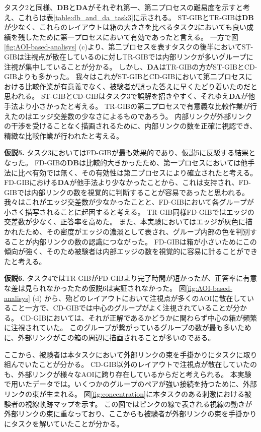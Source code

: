 \documentclass{kuee}
\begin{document}
タスク2と同様、{\bf DB}と{\bf DA}がそれぞれ第一、第二プロセスの難易度を示すと考え、これらは表\ref{table:db_and_da_task3}に示される。
ST-GIBとTR-GIBは{\bf DB}が少なく、これらのレイアウトは箱の大きさを比べるタスク2においても良い成績を残したために第一プロセスにおいて有効であったと言える。
一方で図\ref{fig:AOI-based-analisys} (c)より、第二プロセスを表すタスクの後半においてST-GIBは注視点が散在しているのに対しTR-GIBでは内部リンクが多いグループに注視が集中していることが分かる。
しかし、{\bf DA}はTR-GIBの方がST-GIBとCD-GIBよりも多かった。
我々はこれがST-GIBとCD-GIBにおいて第二プロセスにおける比較作業が有意義でなく、被験者が誤った答えに早くたどり着いたのだと思われる。
ST-GIBとCD-GIBはタスク3で誤解を招きやすく、それゆえ{\bf DA}が他手法より小さかったと考える。
TR-GIBの第二プロセスで有意義な比較作業が行えたのはエッジ交差数の少なさによるものであろう。
内部リンクが外部リンクの干渉を受けることなく描画されるために、内部リンクの数を正確に視認でき、精緻な比較作業が行われたと考える。

{\bf 仮説5.} タスク3においてはFD-GIBが最も効果的であり、仮説5に反駁する結果となった。
FD-GIBの{\bf DB}は比較的大きかったため、第一プロセスにおいては他手法に比べ有効では無く、その有効性は第二プロセスにより確立されたと考える。
FD-GIBにおける{\bf DA}が他手法より少なかったことから、これは支持され、FD-GIBでは内部リンクの数を視覚的に判断することが容易であったと思われる。
我々はこれがエッジ交差数が少なかったことと、FD-GIBにおいて各グループが小さく描写されることに起因すると考える。
TR-GIB同様FD-GIBではエッジの交差数が少なく、正答率を高めた。
また、本実験においてはエッジが灰色に描かれたため、その密度がエッジの濃淡として表され、グループ内部の色を判別することが内部リンクの数の認識につながった。
FD-GIBは箱が小さいためにこの傾向が強く、そのため被験者は内部エッジの数を視覚的に容易に計ることができたと考える。

{\bf 仮説6.} タスク4ではTR-GIBがFD-GIBより完了時間が短かったが、正答率に有意な差は見られなかったため仮説6は実証されなかった。
図\ref{fig:AOI-based-analisys} (d) から、殆どのレイアウトにおいて注視点が多くのAOIに散在していること一方で、CD-GIBでは中心のグループがよく注視されていることが分かる。
CD-GIBにおいては、それが正解であるかどうかに関わらず中心の箱が頻繁に注視されていた。
このグループが繋がっているグループの数が最も多いために、外部リンクがこの箱の周辺に描画されることが多いのである。

ここから、被験者は本タスクにおいて外部リンクの束を手掛かりにタスクに取り組んでいたことが分かる。
CD-GIB以外のレイアウトで注視点が散在していたのも、外部リンクが様々なAOIに跨り存在しているからだと考えられる。
本実験で用いたデータでは。いくつかのグループのペアが強い接続を持つために、外部リンクの束が生まれる。
図\ref{fig:concentration}に本タスクのある刺激における被験者の視線軌跡マップを示す。
この図ではピンクの線で表される視線の動きが外部リンクの束に重なっており、ここからも被験者が外部リンクの束を手掛かりにタスクを解いていたことが分かる。
\end{document}
